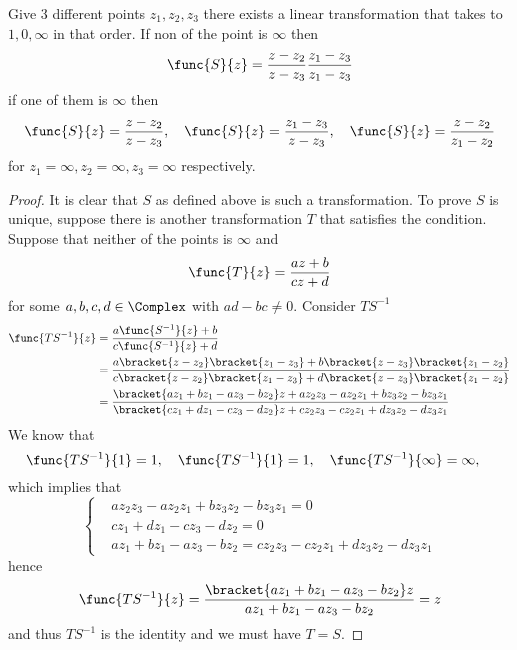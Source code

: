 \begin{proposition}
    Give 3 different points \(z_1,z_2,z_3\) there exists a linear transformation that takes to \(1, 0 , \infty\) in that order. If non of the point is \(\infty\) then 
    \begin{equation*}
        \func{S}{z} = \dfrac{z - z_2}{z - z_3} \dfrac{z_1 - z_3}{z_1 - z_3}
    \end{equation*}
    if one of them is \(\infty\) then 
    \begin{equation*}
        \func{S}{z} = \dfrac{z - z_2}{z - z_3} , \quad \func{S}{z} = \dfrac{z_1 - z_3}{z - z_3} , \quad \func{S}{z} = \dfrac{z - z_2}{z_1 - z_2}
    \end{equation*}
    for \(z_1 =\infty, z_2 = \infty, z_3 = \infty\) respectively.
\end{proposition}
\begin{proof}
    It is clear that \(S\) as defined above is such a transformation. To prove \(S\) is unique, suppose there is another transformation \(T\) that satisfies the condition. Suppose that neither of the points is \(\infty\) and  
    \begin{equation*}
        \func{T}{z} = \dfrac{az + b}{cz + d}
    \end{equation*}
    for some \(a,b,c,d \in \Complex\) with \(ad - bc \neq 0\). Consider \(TS^{-1}\)
    \begin{align*}
        \func{TS^{-1}}{z} &= \dfrac{a\func{S^{-1}}{z} +b }{c \func{S^{-1}}{z} + d}\\
        &= \dfrac{a \bracket{z - z_2}\bracket{z_1 - z_3}  + b \bracket{z - z_3}\bracket{z_1 - z_2}}{c \bracket{z - z_2}\bracket{z_1 - z_3}  + d \bracket{z - z_3}\bracket{z_1 - z_2}}\\
        &= \dfrac{\bracket{az_1 + bz_1 - az_3 - bz_2} z + az_2z_3 - az_2z_1 + bz_3z_2 - bz_3z_1}{\bracket{cz_1 + dz_1 - cz_3 - dz_2} z + cz_2z_3 - cz_2z_1 + dz_3z_2 - dz_3z_1}
    \end{align*}
    We know that 
    \begin{equation*}
        \func{TS^{-1}}{1} = 1, \quad  \func{TS^{-1}}{1} = 1, \quad  \func{TS^{-1}}{\infty} = \infty, \quad 
    \end{equation*}
    which implies that 
    \begin{equation*}
        \begin{cases}
            &az_2z_3 - az_2z_1 + bz_3z_2 - bz_3z_1 = 0\\
            &cz_1 + dz_1 - cz_3 - dz_2 = 0\\
            &az_1 + bz_1 - az_3 - bz_2 = cz_2z_3 - cz_2z_1 + dz_3z_2 - dz_3z_1
        \end{cases}
    \end{equation*}
    hence 
    \begin{equation*}
        \func{TS^{-1}}{z} = \dfrac{\bracket{az_1 + bz_1 - az_3 - bz_2} z}{az_1 + bz_1 - az_3 - bz_2} = z
    \end{equation*}
    and thus \(TS^{-1}\) is the identity and we must have \(T = S\).
\end{proof}
